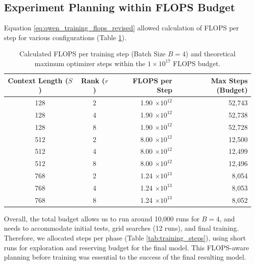 \documentclass{article}
\begin{document}
\subsection{Experiment Planning within FLOPS Budget}

Equation \ref{eq:qwen_training_flops_revised} allowed calculation of FLOPS per step for various configurations (Table \ref{tab:flops_vs_steps}).

\begin{table}[!htbp]
\renewcommand{\arraystretch}{1.4} \centering \setlength{\tabcolsep}{8pt}
\begin{tabular}{@{}ccrr@{}}
    \toprule \textbf{Context Length ($S$)} & \textbf{Rank ($r$)} & \textbf{FLOPS per Step} & \textbf{Max Steps (Budget)} \\ \midrule
    128 & 2 &  1.90 $\times 10^{12}$ & 52,743 \\
    128 & 4 &  1.90 $\times 10^{12}$ & 52,738 \\
    128 & 8 &  1.90 $\times 10^{12}$ & 52,728 \\ \midrule
    512 & 2 &  8.00 $\times 10^{12}$ & 12,500 \\
    512 & 4 &  8.00 $\times 10^{12}$ & 12,499 \\
    512 & 8 &  8.00 $\times 10^{12}$ & 12,496 \\ \midrule
    768 & 2 & 1.24 $\times 10^{13}$ & 8,054 \\
    768 & 4 & 1.24 $\times 10^{13}$ & 8,053 \\
    768 & 8 & 1.24 $\times 10^{13}$ & 8,052 \\
    \bottomrule
\end{tabular}
\caption{Calculated FLOPS per training step (Batch Size $B=4$) and theoretical maximum optimizer steps within the $1 \times 10^{17}$ FLOPS budget.} \label{tab:flops_vs_steps}
\end{table}

Overall, the total budget allows us to run around 10,000 runs for $B=4$, and needs to accommodate initial tests, grid searches (12 runs), and final training. Therefore, we allocated steps per phase (Table \ref{tab:training_steps}), using short runs for exploration and reserving budget for the final model. This FLOPS-aware planning before training was essential to the success of the final resulting model.
\end{document}
